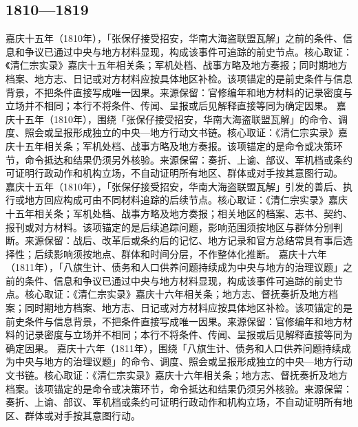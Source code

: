 \subsection{1810—1819}
嘉庆十五年（1810年），「张保仔接受招安，华南大海盗联盟瓦解」之前的条件、信息和争议已通过中央与地方材料显现，构成该事件可追踪的前史节点。核心取证：《清仁宗实录》嘉庆十五年相关条；军机处档、战事方略及地方奏报；同时期地方档案、地方志、日记或对方材料应按具体地区补检。该项锚定的是前史条件与信息背景，不把条件直接写成唯一因果。来源保留：官修编年和地方材料的记录密度与立场并不相同；本行不将条件、传闻、呈报或后见解释直接等同为确定因果。
嘉庆十五年（1810年），围绕「张保仔接受招安，华南大海盗联盟瓦解」的命令、调度、照会或呈报形成独立的中央—地方行动文书链。核心取证：《清仁宗实录》嘉庆十五年相关条；军机处档、战事方略及地方奏报。该项锚定的是命令或决策环节，命令抵达和结果仍须另外核验。来源保留：奏折、上谕、部议、军机档或条约可证明行政动作和机构立场，不自动证明所有地区、群体或对手按其意图行动。
嘉庆十五年（1810年），「张保仔接受招安，华南大海盗联盟瓦解」引发的善后、执行或地方回应构成可由不同材料追踪的后续节点。核心取证：《清仁宗实录》嘉庆十五年相关条；军机处档、战事方略及地方奏报；相关地区的档案、志书、契约、报刊或对方材料。该项锚定的是后续追踪问题，影响范围须按地区与群体分别判断。来源保留：战后、改革后或条约后的记忆、地方记录和官方总结常具有事后选择性；后续影响须按地点、群体和时间分层，不作整体化推断。
嘉庆十六年（1811年），「八旗生计、债务和人口供养问题持续成为中央与地方的治理议题」之前的条件、信息和争议已通过中央与地方材料显现，构成该事件可追踪的前史节点。核心取证：《清仁宗实录》嘉庆十六年相关条；地方志、督抚奏折及地方档案；同时期地方档案、地方志、日记或对方材料应按具体地区补检。该项锚定的是前史条件与信息背景，不把条件直接写成唯一因果。来源保留：官修编年和地方材料的记录密度与立场并不相同；本行不将条件、传闻、呈报或后见解释直接等同为确定因果。
嘉庆十六年（1811年），围绕「八旗生计、债务和人口供养问题持续成为中央与地方的治理议题」的命令、调度、照会或呈报形成独立的中央—地方行动文书链。核心取证：《清仁宗实录》嘉庆十六年相关条；地方志、督抚奏折及地方档案。该项锚定的是命令或决策环节，命令抵达和结果仍须另外核验。来源保留：奏折、上谕、部议、军机档或条约可证明行政动作和机构立场，不自动证明所有地区、群体或对手按其意图行动。
